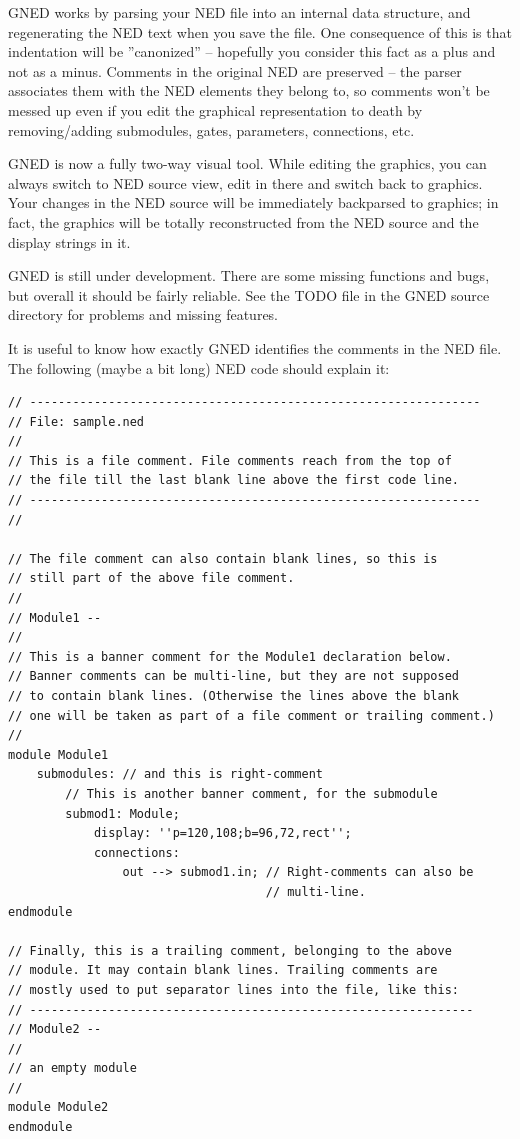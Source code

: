 GNED works by parsing your NED file into an internal data structure,
and regenerating the NED text when you save the file. One consequence
of this is that indentation will be ''canonized''
-- hopefully you consider this fact as a plus and not as a minus.
Comments in the original NED are preserved -- the parser associates
them with the NED elements they belong to, so comments won't
be messed up even if you edit the graphical representation to
death by removing/adding submodules, gates, parameters, connections,
etc.

GNED is now a fully two-way visual tool. While editing the graphics,
you can always switch to NED source view, edit in there and switch
back to graphics. Your changes in the NED source will be immediately
backparsed to graphics; in fact, the graphics will be totally
reconstructed from the NED source and the display strings in
it.

GNED is still under development. There are some missing functions
and bugs, but overall it should be fairly reliable. See the TODO
file in the GNED source directory for problems and missing features.




It is useful to know how exactly GNED identifies the comments
in the NED file. The following (maybe a bit long) NED code should
explain it:

\begin{verbatim}
// ---------------------------------------------------------------
// File: sample.ned
//
// This is a file comment. File comments reach from the top of
// the file till the last blank line above the first code line.
// ---------------------------------------------------------------
//

// The file comment can also contain blank lines, so this is
// still part of the above file comment.
//
// Module1 --
//
// This is a banner comment for the Module1 declaration below.
// Banner comments can be multi-line, but they are not supposed
// to contain blank lines. (Otherwise the lines above the blank
// one will be taken as part of a file comment or trailing comment.)
//
module Module1
    submodules: // and this is right-comment
        // This is another banner comment, for the submodule
        submod1: Module;
            display: ''p=120,108;b=96,72,rect'';
            connections:
                out --> submod1.in; // Right-comments can also be
                                    // multi-line.
endmodule

// Finally, this is a trailing comment, belonging to the above
// module. It may contain blank lines. Trailing comments are
// mostly used to put separator lines into the file, like this:
// --------------------------------------------------------------
// Module2 --
//
// an empty module
//
module Module2
endmodule
\end{verbatim}


